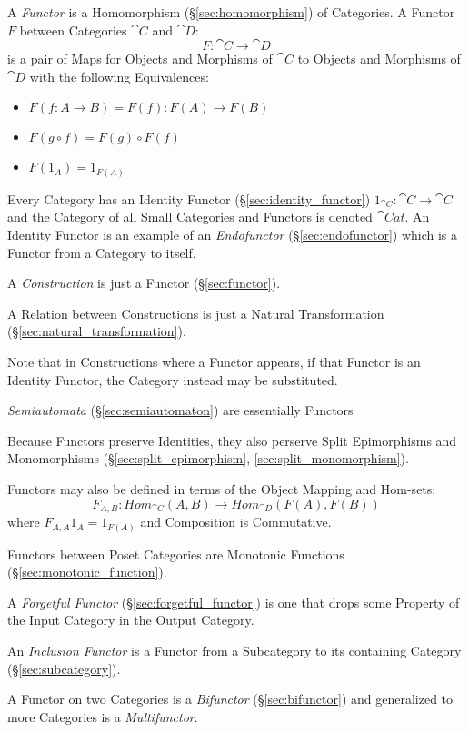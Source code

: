 A \emph{Functor} is a Homomorphism (\S\ref{sec:homomorphism}) of
Categories. A Functor $F$ between Categories $\cat{C}$ and $\cat{D}$:
\[
  F : \cat{C} \rightarrow \cat{D}
\]
is a pair of Maps for Objects and Morphisms of $\cat{C}$ to Objects
and Morphisms of $\cat{D}$ with the following Equivalences:
\begin{itemize}
\item $F(f : A \rightarrow B) = F(f) : F(A) \rightarrow F(B)$
\item $F(g \circ f) = F(g) \circ F(f)$
\item $F(1_A) = 1_{F(A)}$
\end{itemize}
Every Category has an Identity Functor (\S\ref{sec:identity_functor})
$1_{\cat{C}} : \cat{C} \rightarrow \cat{C}$ and the Category
of all Small Categories and Functors is denoted $\cat{Cat}$. An
Identity Functor is an example of an \emph{Endofunctor}
(\S\ref{sec:endofunctor}) which is a Functor from a Category to
itself.

A \emph{Construction} is just a Functor (\S\ref{sec:functor}).

A Relation between Constructions is just a Natural Transformation
(\S\ref{sec:natural_transformation}).

\fist Note that in Constructions where a Functor appears, if
that Functor is an Identity Functor, the Category instead may be
substituted.

\fist \emph{Semiautomata} (\S\ref{sec:semiautomaton}) are essentially
Functors

Because Functors preserve Identities, they also perserve Split
Epimorphisms and Monomorphisms (\S\ref{sec:split_epimorphism},
\ref{sec:split_monomorphism}).

Functors may also be defined in terms of the Object Mapping and
Hom-sets:
\[
  F_{A,B} : Hom_{\cat{C}}(A,B) \rightarrow Hom_{\cat{D}}(F(A),F(B))
\]
where $F_{A,A}1_A = 1_{F(A)}$ and Composition is Commutative.

Functors between Poset Categories are Monotonic Functions
(\S\ref{sec:monotonic_function}).

A \emph{Forgetful Functor} (\S\ref{sec:forgetful_functor}) is one that
drops some Property of the Input Category in the Output Category.

An \emph{Inclusion Functor} is a Functor from a Subcategory to its
containing Category (\S\ref{sec:subcategory}).

A Functor on two Categories is a \emph{Bifunctor}
(\S\ref{sec:bifunctor}) and generalized to more Categories is a
\emph{Multifunctor}.

